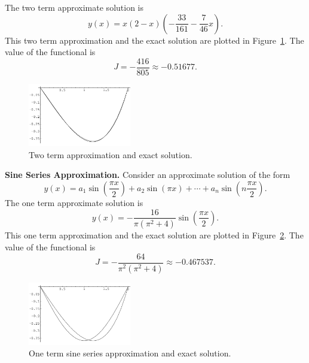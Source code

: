 \begin{Solution}
\begin{enumerate}
    The two term approximate solution is
    \[
    y(x) = x (2 - x) \left( - \frac{33}{161} - \frac{7}{46} x \right).
    \]
    This two term approximation and the exact solution are plotted in 
    Figure~\ref{p2_2t}.  The value of the functional is 
    \[
    J = - \frac{416}{805} \approx -0.51677.
    \]

    \begin{figure}[h!]
      \begin{center}
        \includegraphics[width=0.4\textwidth]{cv/cv/p2_2t}
      \end{center}
      \caption{Two term approximation and exact solution.}
      \label{p2_2t}
    \end{figure}









    \textbf{Sine Series Approximation.}
    Consider an approximate solution of the form
    \[
    y(x) = a_1 \sin \left( \frac{\pi x}{2} \right)
    + a_2 \sin \left( \pi x \right) + \cdots +
    a_n \sin \left( n \frac{\pi x}{2} \right).
    \]
    The one term approximate solution is
    \[
    y(x) = - \frac{16}{ \pi (\pi^2 + 4) } \sin \left( \frac{\pi x}{2} \right).
    \]
    This one term approximation and the exact solution are plotted in 
    Figure~\ref{p2_1s}.  The value of the functional is 
    \[
    J = - \frac{64}{\pi^2 (\pi^2 + 4)} \approx -0.467537.
    \]

    \begin{figure}[h!]
      \begin{center}
        \includegraphics[width=0.4\textwidth]{cv/cv/p2_1s}
      \end{center}
      \caption{One term sine series approximation and exact solution.}
      \label{p2_1s}
    \end{figure}


\end{enumerate}
\end{Solution}
